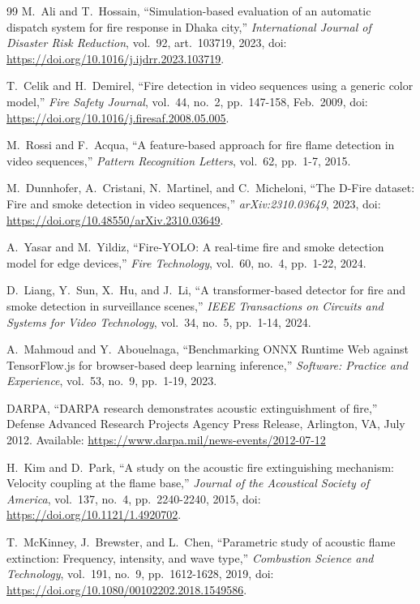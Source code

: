 \begin{thebibliography}{99}
M.~Ali and T.~Hossain, ``Simulation-based evaluation of an automatic dispatch system for fire response in Dhaka city,''
\textit{International Journal of Disaster Risk Reduction}, vol.~92, art.~103719, 2023,
doi: \url{https://doi.org/10.1016/j.ijdrr.2023.103719}.

T.~Celik and H.~Demirel, ``Fire detection in video sequences using a generic color model,''
\textit{Fire Safety Journal}, vol.~44, no.~2, pp.~147-158, Feb.~2009,
doi: \url{https://doi.org/10.1016/j.firesaf.2008.05.005}.

M.~Rossi and F.~Acqua, ``A feature-based approach for fire flame detection in video sequences,''
\textit{Pattern Recognition Letters}, vol.~62, pp.~1-7, 2015.

M.~Dunnhofer, A.~Cristani, N.~Martinel, and C.~Micheloni, ``The D-Fire dataset: Fire and smoke detection in video sequences,''
\textit{arXiv:2310.03649}, 2023,
doi: \url{https://doi.org/10.48550/arXiv.2310.03649}.

A.~Yasar and M.~Yildiz, ``Fire-YOLO: A real-time fire and smoke detection model for edge devices,''
\textit{Fire Technology}, vol.~60, no.~4, pp.~1-22, 2024.

D.~Liang, Y.~Sun, X.~Hu, and J.~Li, ``A transformer-based detector for fire and smoke detection in surveillance scenes,''
\textit{IEEE Transactions on Circuits and Systems for Video Technology}, vol.~34, no.~5, pp.~1-14, 2024.

A.~Mahmoud and Y.~Abouelnaga, ``Benchmarking ONNX Runtime Web against TensorFlow.js for browser-based deep learning inference,''
\textit{Software: Practice and Experience}, vol.~53, no.~9, pp.~1-19, 2023.

DARPA, ``DARPA research demonstrates acoustic extinguishment of fire,''
Defense Advanced Research Projects Agency Press Release, Arlington, VA, July 2012.
Available: \url{https://www.darpa.mil/news-events/2012-07-12}

H.~Kim and D.~Park, ``A study on the acoustic fire extinguishing mechanism: Velocity coupling at the flame base,''
\textit{Journal of the Acoustical Society of America}, vol.~137, no.~4, pp.~2240-2240, 2015,
doi: \url{https://doi.org/10.1121/1.4920702}.

T.~McKinney, J.~Brewster, and L.~Chen, ``Parametric study of acoustic flame extinction: Frequency, intensity, and wave type,''
\textit{Combustion Science and Technology}, vol.~191, no.~9, pp.~1612-1628, 2019,
doi: \url{https://doi.org/10.1080/00102202.2018.1549586}.


\end{thebibliography}
